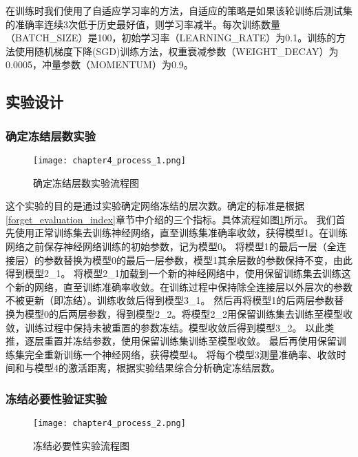 在训练时我们使用了自适应学习率的方法，自适应的策略是如果该轮训练后测试集的准确率连续3次低于历史最好值，则学习率减半。每次训练数量（BATCH\_SIZE）是100，初始学习率（LEARNING\_RATE）为0.1。训练的方法使用随机梯度下降(SGD)训练方法，权重衰减参数（WEIGHT\_DECAY）为0.0005，冲量参数（MOMENTUM）为0.9。

\subsection{实验设计}
\subsubsection{确定冻结层数实验}
\begin{figure}
    \centering
    \texttt{[image: chapter4\_process\_1.png]}
    \caption{确定冻结层数实验流程图}
    \label{fig:chapter4_process_1}
\end{figure}

这个实验的目的是通过实验确定网络冻结的层次数。确定的标准是根据\ref{forget_evaluation_index}章节中介绍的三个指标。具体流程如图\ref{fig:chapter4_process_1}所示。
我们首先使用正常训练集去训练神经网络，直至训练集准确率收敛，获得模型1。在训练网络之前保存神经网络训练的初始参数，记为模型0。
将模型1的最后一层（全连接层）的参数替换为模型0的最后一层参数，模型1其余层数的参数保持不变，由此得到模型2\_1。
将模型2\_1加载到一个新的神经网络中，使用保留训练集去训练这个新的网络，直至训练准确率收敛。在训练过程中保持除全连接层以外层次的参数不被更新（即冻结）。训练收敛后得到模型3\_1。
然后再将模型1的后两层参数替换为模型0的后两层参数，得到模型2\_2。将模型2\_2用保留训练集去训练至模型收敛，训练过程中保持未被重置的参数冻结。模型收敛后得到模型3\_2。
以此类推，逐层重置并冻结参数，使用保留训练集训练至模型收敛。
最后再使用保留训练集完全重新训练一个神经网络，获得模型4。
将每个模型3测量准确率、收敛时间和与模型4的激活距离，根据实验结果综合分析确定冻结层数。

\subsubsection{冻结必要性验证实验}
\begin{figure}
    \centering
    \texttt{[image: chapter4\_process\_2.png]}
    \caption{冻结必要性实验流程图}
    \label{fig:chapter4_process_2}
\end{figure}

